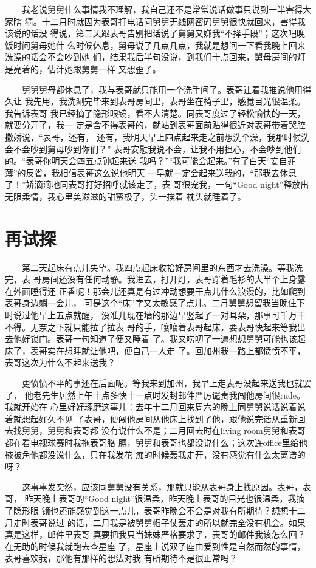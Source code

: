 \documentclass[12pt]{book}
\begin{document}
　　我老说舅舅什么事情我不理解，我自己还不是常常说话做事只说到一半害得大家瞎
猜。十二月时就因为表哥打电话问舅舅无线网密码舅舅很快就回来，害得我该说的话没
得说，第二天跟表哥告别把话说了舅舅又嫌我“不择手段”；这次吧晚饭时问舅母她什
么时候休息，舅母说了几点几点，我就是想问一下看我晚上回来洗澡的话会不会吵到她
们，结果我后半句没说，到我们十点回来，舅母房间的灯是亮着的，估计她跟舅舅一样
又想歪了。

　　舅舅舅母都休息了，我与表哥就只能用一个洗手间了。表哥让着我推说他用得久让
我先用，我洗涮完毕来到表哥房间里，表哥坐在椅子里，感觉目光很温柔。我告诉表哥
我已经摘了隐形眼镜，看不大清楚。同表哥度过了轻松愉快的一天，就要分开了，我一
定是舍不得表哥的，就站到表哥面前贴得很近对表哥带着哭腔撒娇说，“表哥，还有，
还有，我明天早上四点起来走之前想洗个澡，我那时候洗会不会吵到舅母吵到你们？”
表哥安慰我说不会，让我不用担心，不会吵到他们的。“表哥你明天会四五点钟起来送
我吗？”“我可能会起来。”有了白天“妄自菲薄”的反省，我相信表哥这么说他明天
一早就一定会起来送我的，“那我去休息了！”娇滴滴地同表哥打好招呼就该走了，表
哥很宠我，一句“Good night”释放出无限柔情，我心里美滋滋的甜蜜极了，头一挨着
枕头就睡着了。
\section{再试探}
\label{sec-8-12}

　　第二天起床有点儿失望。我四点起床收拾好房间里的东西才去洗澡。等我洗完，表
哥房间还没有任何动静。我进去，打开灯，表哥穿着毛衫的大半个上身露在外面睡得还
正香呢！那会儿还真是有过冲动想要干点儿什么浪漫的，比如爬到表哥身边躺一会儿，
可是这个“床”字又太敏感了点儿。二月舅舅想留我当晚住下时说过他早上五点就醒，
没准儿现在墙的那边早竖起了一对耳朵，那事可千万干不得。无奈之下就只能拉了拉表
哥的手，嚷嚷着表哥起床，要表哥快起来等我出去他好锁门。表哥一句知道了便又睡着
了。我又唠叨了一遍想想舅舅可能也该起床了，表哥实在想睡就让他吧，便自己一人走
了。回加州我一路上都愤愤不平，表哥这次为什么不起来送我？

　　更愤愤不平的事还在后面呢。等我来到加州，我早上走表哥没起来送我也就罢了，
他老先生居然上午十点多快十一点时发封邮件严厉谴责我闯他房间很rude。我就开始在
心里好好琢磨这事儿：去年十二月回来周六的晚上同舅舅说话说着说着就想起好久不见
了表哥，便闯他房间从他床上找到了他，跟他说完话从重新回去找舅舅，舅舅和表哥都
没有说什么不是；二月回去时在living room舅舅和表哥都在看电视球赛时我拖表哥胳
膊，舅舅和表哥也都没说什么；这次连office里给他掖被角他都没说什么，只在我发花
痴的时候轰我走开，没有感觉有什么太离谱的呀？

　　这事事发突然，应该同舅舅没有关系，那就只能从表哥身上找原因。表哥，表哥，
昨天晚上表哥的“Good night”很温柔，昨天晚上表哥的目光也很温柔，我摘了隐形眼
镜也还能感觉到这一点儿，表哥昨晚会不会是对我有所期待？想想十二月走时表哥说过
的话，二月我是被舅舅帽子仗轰走的所以就完全没有机会。如果真是这样，邮件里表哥
真要把我只当妹妹严格要求了，表哥的邮件我该怎么回？在无助的时候我就跑去查星座
了，星座上说双子座由爱到性是自然而然的事情，表哥喜欢我，那他有那样的想法对我
有所期待不是很正常吗？
\end{document}
